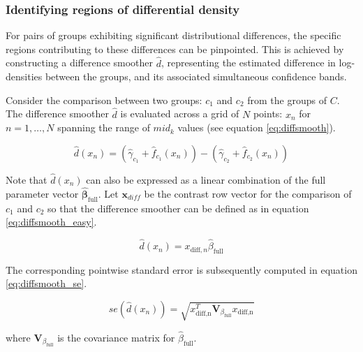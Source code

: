 
\subsubsection{Identifying regions of differential density}
For pairs of groups exhibiting significant distributional differences, the specific regions contributing to these differences can be pinpointed. This is achieved by constructing a difference smoother $\hat{d}$, representing the estimated difference in log-densities between the groups, and its associated simultaneous confidence bands.

Consider the comparison between two groups: $c_1$ and $c_2$ from the groups of $C$. The difference smoother $\hat{d}$ is evaluated across a grid of $N$ points: $x_n$ for $n = 1, \ldots, N$ spanning the range of $mid_k$ values (see equation \ref{eq:diffsmooth}).

\begin{equation}
\hat{d}(x_n) = (\hat{\gamma}_{c_1} + \hat{f}_{c_1}(x_n)) - (\hat{\gamma}_{c_2} + \hat{f}_{c_2}(x_n))
\label{eq:diffsmooth}
\end{equation}

Note that $\hat{d}(x_n)$ can also be expressed as a linear combination of the full parameter vector $\hat{\boldsymbol{\beta}}_{\text{full}}$. Let $\boldsymbol{x}_{diff}$ be the contrast row vector for the comparison of $c_1$ and $c_2$ so that the difference smoother can be defined as in equation \ref{eq:diffsmooth_easy}.

\begin{equation}
\hat{d}(x_n) = x_{\text{diff},n}\hat{\beta}_{\text{full}}
\label{eq:diffsmooth_easy}
\end{equation}

The corresponding pointwise standard error is subsequently computed in equation \ref{eq:diffsmooth_se}.

\begin{equation}
se(\hat{d}(x_n)) = \sqrt{x_{\text{diff,n}}^T\boldsymbol{V}_{\beta_{\text{full}}}x_{\text{diff,n}}}
\label{eq:diffsmooth_se}
\end{equation}

where $\boldsymbol{V}_{\beta_{\text{full}}}$ is the covariance matrix for $\hat{\beta}_{\text{full}}$.

